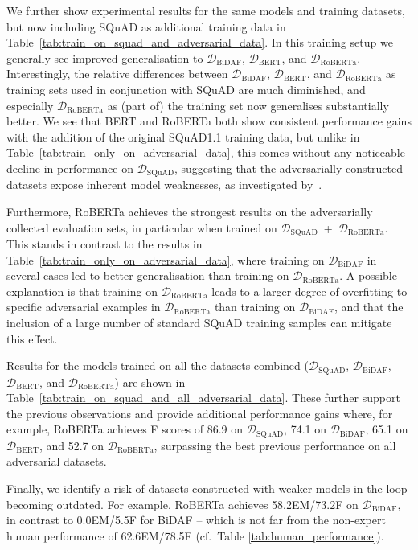 \documentclass[11pt,a4paper]{article}
\newcommand{\dataset}[1]{\ensuremath{\mathcal{D_{\mathrm{#1}}}}}
\newcommand{\squad}{SQuAD}
\newcommand{\squadone}{SQuAD1.1}
\begin{document}
We further show experimental results for the same models and training datasets, but now including \squad{} as additional training data in Table~\ref{tab:train_on_squad_and_adversarial_data}.
In this training setup we generally see improved generalisation to \dataset{BiDAF}, \dataset{BERT}, and \dataset{RoBERTa}.
Interestingly, the relative differences between \dataset{BiDAF}, \dataset{BERT}, and \dataset{RoBERTa} as training sets used in conjunction with \squad{} are much diminished, and especially \dataset{RoBERTa} as (part of) the training set now generalises substantially better.
We see that BERT and RoBERTa both show consistent performance gains with the addition of the original \squadone{} training data, but unlike in Table~\ref{tab:train_only_on_adversarial_data}, this comes without any noticeable decline in performance on \dataset{SQuAD}, suggesting that the adversarially constructed datasets expose inherent model weaknesses, as investigated by~\citet{liu-etal-2019-inoculation}.


Furthermore, RoBERTa achieves the strongest results on the adversarially collected evaluation sets, in particular when trained on \dataset{SQuAD}~+~\dataset{RoBERTa}.
This stands in contrast to the results in Table~\ref{tab:train_only_on_adversarial_data}, where training on \dataset{BiDAF} in several cases led to better generalisation than training on \dataset{RoBERTa}.
A possible explanation is that training on \dataset{RoBERTa} leads to a larger degree of overfitting to specific adversarial examples in \dataset{RoBERTa} than training on \dataset{BiDAF}, and that the inclusion of a large number of standard \squad{} training samples can mitigate this effect.


Results for the models trained on all the datasets combined (\dataset{SQuAD}, \dataset{BiDAF}, \dataset{BERT}, and \dataset{RoBERTa}) are shown in Table~\ref{tab:train_on_squad_and_all_adversarial_data}.
These further support the previous observations and provide additional performance gains where, for example, RoBERTa achieves F scores of 86.9 on \dataset{SQuAD}, 74.1 on \dataset{BiDAF}, 65.1 on \dataset{BERT}, and 52.7 on \dataset{RoBERTa}, surpassing the best previous performance on all adversarial datasets.


Finally, we identify a risk of datasets constructed with weaker models in the loop becoming outdated. 
For example, RoBERTa achieves 58.2EM/73.2F on \dataset{BiDAF}, in contrast to 0.0EM/5.5F for BiDAF -- which is not far from the non-expert human performance of 62.6EM/78.5F (cf.~Table \ref{tab:human_performance}).
\end{document}

